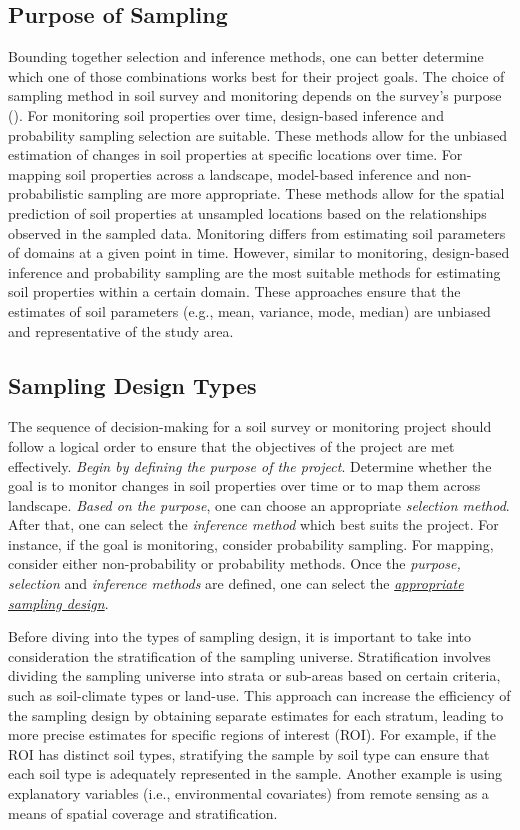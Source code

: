 \documentclass[
  10pt,
  b5paper,
  oneside]{book}
\begin{document}
\subsection{Purpose of Sampling}\label{sampling-purpose}

Bounding together selection and inference methods, one can better determine which one of those combinations works best for their project goals. The choice of sampling method in soil survey and monitoring depends on the survey's purpose (). For monitoring soil properties over time, design-based inference and probability sampling selection are suitable. These methods allow for the unbiased estimation of changes in soil properties at specific locations over time. For mapping soil properties across a landscape, model-based inference and non-probabilistic sampling are more appropriate. These methods allow for the spatial prediction of soil properties at unsampled locations based on the relationships observed in the sampled data. Monitoring differs from estimating soil parameters of domains at a given point in time. However, similar to monitoring, design-based inference and probability sampling are the most suitable methods for estimating soil properties within a certain domain. These approaches ensure that the estimates of soil parameters (e.g., mean, variance, mode, median) are unbiased and representative of the study area.

\subsection{Sampling Design Types}\label{design-types}

The sequence of decision-making for a soil survey or monitoring project should follow a logical order to ensure that the objectives of the project are met effectively. \emph{Begin by defining the purpose of the project}. Determine whether the goal is to monitor changes in soil properties over time or to map them across landscape. \emph{Based on the purpose}, one can choose an appropriate \emph{selection method}. After that, one can select the \emph{inference method} which best suits the project. For instance, if the goal is monitoring, consider probability sampling. For mapping, consider either non-probability or probability methods. Once the \emph{purpose, selection} and \emph{inference methods} are defined, one can select the \ul{\emph{appropriate sampling design}}.

Before diving into the types of sampling design, it is important to take into consideration the stratification of the sampling universe. Stratification involves dividing the sampling universe into strata or sub-areas based on certain criteria, such as soil-climate types or land-use. This approach can increase the efficiency of the sampling design by obtaining separate estimates for each stratum, leading to more precise estimates for specific regions of interest (ROI). For example, if the ROI has distinct soil types, stratifying the sample by soil type can ensure that each soil type is adequately represented in the sample. Another example is using explanatory variables (i.e., environmental covariates) from remote sensing as a means of spatial coverage and stratification.
\end{document}
